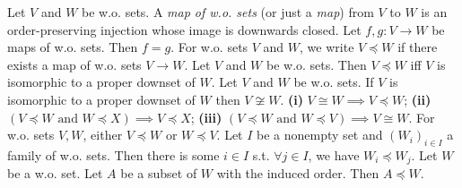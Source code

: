  Let $V$ and $W$ be w.o. sets. A \textit{map of w.o. sets} (or just a \textit{map}) from $V$ to $W$ is an order-preserving injection whose image is downwards closed.
 Let $f, g \colon V \to W$ be maps of w.o. sets. Then $f = g$.
 For w.o. sets $V$ and $W$, we write $V \preceq W$ if there exists a map of w.o. sets $V \to W$.
 Let $V$ and $W$ be w.o. sets. Then $V \preceq W$ iff $V$ is isomorphic to a proper downset of $W$.
 Let $V$ and $W$ be w.o. sets. If $V$ is isomorphic to a proper downset of $W$ then $V \not \cong W$.
 \textbf{(i)} $V \cong W \implies V \preceq W$; \textbf{(ii)} $(V \preceq W \text{ and } W \preceq X) \implies V \preceq X$; \textbf{(iii)} $(V \preceq W \text{ and } W \preceq V) \implies V \cong W$. 
 For w.o. sets $V, W$, either $V \preceq W$ or $W \preceq V$.
 Let $I$ be a nonempty set and $(W_i)_{i \in I}$ a family of w.o. sets. Then there is some $i \in I$ s.t. $\forall j \in I$, we have $W_i \preceq W_j$.
 Let $W$ be a w.o. set. Let $A$ be a subset of $W$ with the induced order. Then $A \preceq W$.
